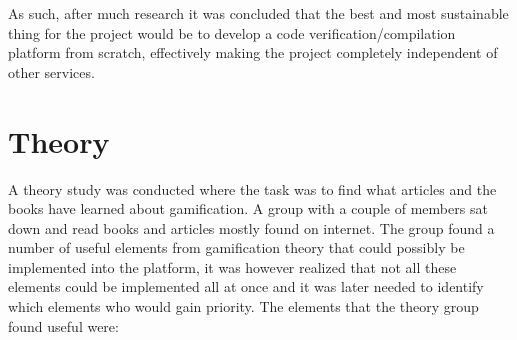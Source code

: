 As such, after much research it was concluded that the best and most sustainable thing for the project would be to develop a code verification/compilation platform from scratch, effectively making the project completely independent of other services.


\section{Theory} 
A theory study was conducted where the task was to find what articles and the books have learned about gamification. A group with a couple of members sat down and read books and articles mostly found on internet. The group found a number of useful elements from gamification theory that could possibly be implemented into the platform, it was however realized that not all these elements could be implemented all at once and it was later needed to identify which elements who would gain priority. The elements that the theory group found useful were:
